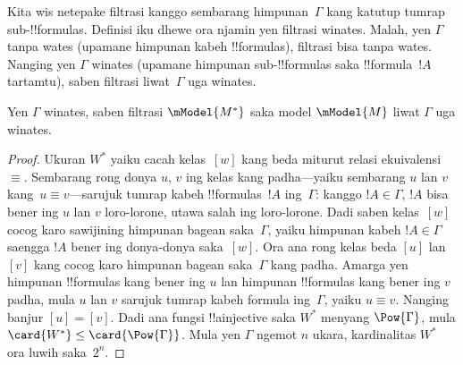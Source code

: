 \documentclass[../../../include/open-logic-section]{subfiles}
\begin{document}


Kita wis netepake filtrasi kanggo sembarang himpunan~$\Gamma$ kang
katutup tumrap sub-!!{formula}s. Definisi iku dhewe ora njamin yen
filtrasi winates. Malah, yen $\Gamma$ tanpa wates (upamane himpunan
kabeh !!{formula}s), filtrasi bisa tanpa wates. Nanging yen
$\Gamma$ winates (upamane himpunan sub-!!{formula}s saka
!!{formula}~$!A$ tartamtu), saben filtrasi liwat~$\Gamma$ uga
winates.

\begin{prop}
  Yen $\Gamma$ winates, saben filtrasi $\mModel{M^*}$ saka model
  $\mModel{M}$ liwat $\Gamma$ uga winates.
\end{prop}

\begin{proof}
  Ukuran $W^*$ yaiku cacah kelas~$[w]$ kang beda miturut relasi
  ekuivalensi~$\equiv$. Sembarang rong donya $u$, $v$ ing kelas kang
  padha---yaiku sembarang $u$ lan $v$ kang~$u \equiv v$---sarujuk
  tumrap kabeh !!{formula}s~$!A$ ing~$\Gamma$: kanggo $!A \in \Gamma$,
  $!A$ bisa bener ing $u$ lan $v$ loro-lorone, utawa salah ing
  loro-lorone. Dadi saben kelas~$[w]$ cocog karo sawijining himpunan
  bagean saka~$\Gamma$, yaiku himpunan kabeh $!A \in \Gamma$ saengga
  $!A$ bener ing donya-donya saka~$[w]$. Ora ana rong kelas beda $[u]$ lan
  $[v]$ kang cocog karo himpunan bagean saka~$\Gamma$ kang padha.
  Amarga yen himpunan !!{formula}s kang bener ing $u$ lan himpunan
  !!{formula}s kang bener ing $v$ padha, mula $u$ lan $v$ sarujuk
  tumrap kabeh formula ing~$\Gamma$, yaiku $u \equiv v$. Nanging
  banjur $[u] = [v]$. Dadi ana fungsi !!a{injective} saka $W^*$
  menyang $\Pow{\Gamma}$, mula
  $\card{W^*} \le \card{\Pow{\Gamma}}$. Mula yen $\Gamma$ ngemot
  $n$ ukara, kardinalitas $W^*$ ora luwih saka~$2^n$.
\end{proof}
\end{document}
